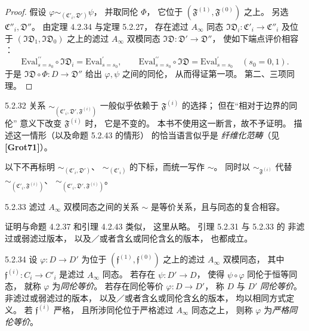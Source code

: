 \begin{proof}
假设
$\varphi\sim_{(\mathfrak C'_i,\mathfrak D')}\psi$，
并取同伦 $\Phi$，
它位于
$(\mathfrak F^{(1)},\mathfrak F^{(0)})$
之上。
另选 $\mathfrak C''_i,\mathfrak D''$。
由定理 4.2.34 与定理 5.2.27，
存在滤过 $A_\infty$ 同态
$\mathfrak{ID}_i:\mathfrak C'_i\to\mathfrak C''_i$
及位于
$(\mathfrak{ID}_1,\mathfrak{ID}_0)$
之上的滤过 $A_\infty$ 双模同态
$\mathfrak{ID}:\mathfrak D'\to\mathfrak D''$，
使如下端点评价相容
：
\[
\mathrm{Eval}^{\prime\prime}_{s=s_0}
\circ\mathfrak{ID}_i
=\mathrm{Eval}^{\prime}_{s=s_0},
\qquad
\mathrm{Eval}^{\prime\prime}_{s=s_0}
\circ\mathfrak{ID}
=\mathrm{Eval}^{\prime}_{s=s_0}
\quad(s_0=0,1).
\]
于是 $\mathfrak{ID}\circ\Phi:D\to\mathfrak D''$
给出 $\varphi,\psi$ 之间的同伦，
从而得证第一项。
第二、三项同理。
\end{proof}

\begin{remark}{5.2.32}\label{rem:5-2-32}
关系
$\sim_{(\mathfrak C'_i,\mathfrak D',
\mathfrak F^{(i)})}$
一般似乎依赖于
$\mathfrak F^{(i)}$ 的选择；
但在“相对于边界的同伦”
意义下改变 $\mathfrak F^{(i)}$ 时，
它是不变的。
本书不使用这一断言，故不予证明。
描述这一情形（以及命题 5.2.43 的情形）
的恰当语言似乎是
\emph{纤维化范畴}（见 \textbf{[Grot71]}）。
\end{remark}

以下不再标明
$\sim_{(\mathfrak C'_i,\mathfrak D')}$、
$\sim_{(\mathfrak C'_i)}$
的下标，而统一写作 $\sim$。
同时以 $\sim_{\mathfrak F^{(i)}}$
代替
$\sim_{(\mathfrak C'_i,\mathfrak F^{(i)})}$、
$\sim_{(\mathfrak C'_i,\mathfrak D',
\mathfrak F^{(i)})}$。

\begin{lemma}{5.2.33}\label{lem:5-2-33}
滤过 $A_\infty$ 双模同态之间的关系 $\sim$
是等价关系，且与同态的复合相容。
\end{lemma}

证明与命题 4.2.37 和引理 4.2.43 类似，
这里从略。
引理 5.2.31 与 5.2.33 的
非滤过或弱滤过版本，
以及／或者含幺或同伦含幺的版本，
也都成立。

\begin{definition}{5.2.34}\label{def:5-2-34}
设 $\varphi:D\to D'$ 为位于
$(\mathfrak f^{(1)},\mathfrak f^{(0)})$
之上的滤过 $A_\infty$ 双模同态，
其中 $\mathfrak f^{(i)}:C_i\to C'_i$
是滤过 $A_\infty$ 同态。
若存在 $\psi:D'\to D$，
使得 $\psi\circ\varphi$
同伦于恒等同态，
就称 $\varphi$ 为\emph{同伦等价}。
若存在同伦等价
$\varphi:D\to D'$，
称 $D$ 与 $D'$ \emph{同伦等价}。
非滤过或弱滤过的版本，
以及／或者含幺或同伦含幺的版本，
均以相同方式定义。
若 $\mathfrak f^{(i)}$ 严格，
且所涉同伦位于严格滤过
$A_\infty$ 同态之上，
则称 $\varphi$ 为\emph{严格同伦等价}。
\end{definition}

